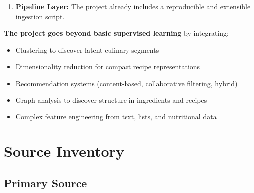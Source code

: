 \documentclass[11pt,a4paper]{article}
\begin{document}
\begin{enumerate}
\begin{itemize}
        \item User-Recipe Bipartite Graph:
        \begin{itemize}
            \item Nodes: users and recipes
            \item Edges: user interactions (ratings)
            \item Use case: collaborative filtering and projection into user-user or item-item graphs
        \end{itemize}
    \end{itemize}
    \textit{Rationale: These graph structures enable recommendation, similarity analysis, and graph-based learning methods.}

    \item \textbf{Pipeline Layer:} The project already includes a reproducible and extensible ingestion script.
\end{enumerate}

\textbf{The project goes beyond basic supervised learning} by integrating:
\begin{itemize}
    \item Clustering to discover latent culinary segments
    \item Dimensionality reduction for compact recipe representations
    \item Recommendation systems (content-based, collaborative filtering, hybrid)
    \item Graph analysis to discover structure in ingredients and recipes
    \item Complex feature engineering from text, lists, and nutritional data
\end{itemize}

\section{Source Inventory}

\subsection{Primary Source}
\end{document}
